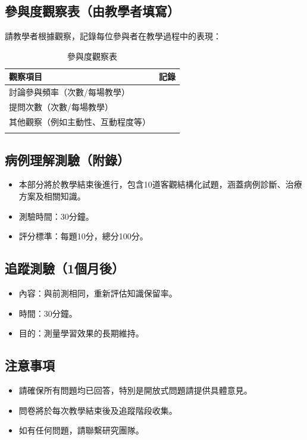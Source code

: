 \documentclass[12pt]{article}
\begin{document}
\subsection*{參與度觀察表（由教學者填寫）}
請教學者根據觀察，記錄每位參與者在教學過程中的表現：

\begin{longtable}{p{8cm} p{8cm}}
\toprule
\textbf{觀察項目} & \textbf{記錄} \\
\midrule
討論參與頻率（次數/每場教學） & \\
提問次數（次數/每場教學） & \\
其他觀察（例如主動性、互動程度等） & \vspace{2cm} \\
\bottomrule
\caption{參與度觀察表}
\end{longtable}

\subsection*{病例理解測驗（附錄）}
\begin{itemize}
    \item 本部分將於教學結束後進行，包含10道客觀結構化試題，涵蓋病例診斷、治療方案及相關知識。
    \item 測驗時間：30分鐘。
    \item 評分標準：每題10分，總分100分。
\end{itemize}

\subsection*{追蹤測驗（1個月後）}
\begin{itemize}
    \item 內容：與前測相同，重新評估知識保留率。
    \item 時間：30分鐘。
    \item 目的：測量學習效果的長期維持。
\end{itemize}

\subsection*{注意事項}
\begin{itemize}
    \item 請確保所有問題均已回答，特別是開放式問題請提供具體意見。
    \item 問卷將於每次教學結束後及追蹤階段收集。
    \item 如有任何問題，請聯繫研究團隊。
\end{itemize}
\end{document}
